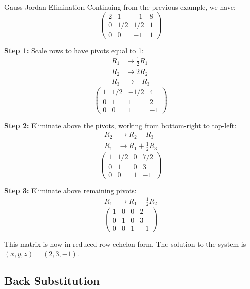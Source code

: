 \documentclass[12pt,a4paper]{article}
\begin{document}
	\begin{example}{Gauss-Jordan Elimination}
		Continuing from the previous example, we have:
		\[
		\left(\begin{array}{ccc|c}
			2 & 1 & -1 & 8 \\
			0 & 1/2 & 1/2 & 1 \\
			0 & 0 & -1 & 1
		\end{array}\right)
		\]
		
		\textbf{Step 1:} Scale rows to have pivots equal to 1:
		\begin{align*}
			R_1 &\to \tfrac{1}{2}R_1 \\
			R_2 &\to 2R_2 \\
			R_3 &\to -R_3
		\end{align*}
		\[
		\left(\begin{array}{ccc|c}
			1 & 1/2 & -1/2 & 4 \\
			0 & 1 & 1 & 2 \\
			0 & 0 & 1 & -1
		\end{array}\right)
		\]
		
		\textbf{Step 2:} Eliminate above the pivots, working from bottom-right to top-left:
		\begin{align*}
			R_2 &\to R_2 - R_3 \\
			R_1 &\to R_1 + \tfrac{1}{2}R_3
		\end{align*}
		\[
		\left(\begin{array}{ccc|c}
			1 & 1/2 & 0 & 7/2 \\
			0 & 1 & 0 & 3 \\
			0 & 0 & 1 & -1
		\end{array}\right)
		\]
		
		\textbf{Step 3:} Eliminate above remaining pivots:
		\begin{align*}
			R_1 &\to R_1 - \tfrac{1}{2}R_2
		\end{align*}
		\[
		\left(\begin{array}{ccc|c}
			1 & 0 & 0 & 2 \\
			0 & 1 & 0 & 3 \\
			0 & 0 & 1 & -1
		\end{array}\right)
		\]
		
		This matrix is now in reduced row echelon form. The solution to the system is $(x, y, z) = (2, 3, -1)$.
	\end{example}
	
	\subsection{Back Substitution}
	
\end{document}
